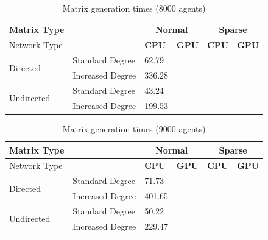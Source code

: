 \documentclass{article}
\begin{document}
\begin{table}[H]
    \centering
    \begin{tabular}{llllll}
        \toprule
        Matrix Type &  & \multicolumn{2}{c}{Normal} & \multicolumn{2}{c}{Sparse}\\
        \midrule 
        Network Type &  &\textbf{CPU} & \textbf{GPU} & \textbf{CPU} & \textbf{GPU} \\
        \midrule
        \multirow{2}{*}{Directed} & Standard Degree & 62.79 & & & \\
                                  & Increased Degree & 336.28 & & & \\
        \multirow{2}{*}{Undirected} & Standard Degree & 43.24 & & & \\
                                  & Increased Degree & 199.53 & & & \\
        \bottomrule
    \end{tabular}
    \label{table:gen_8000}
    \caption{Matrix generation times (8000 agents)}
\end{table}

\begin{table}[H]
    \centering
    \begin{tabular}{llllll}
        \toprule
        Matrix Type &  & \multicolumn{2}{c}{Normal} & \multicolumn{2}{c}{Sparse}\\
        \midrule 
        Network Type &  &\textbf{CPU} & \textbf{GPU} & \textbf{CPU} & \textbf{GPU} \\
        \midrule
        \multirow{2}{*}{Directed} & Standard Degree & 71.73 & & & \\
                                  & Increased Degree & 401.65 & & & \\
        \multirow{2}{*}{Undirected} & Standard Degree & 50.22 & & & \\
                                  & Increased Degree & 229.47 & & & \\
        \bottomrule
    \end{tabular}
    \label{table:gen_9000}
    \caption{Matrix generation times (9000 agents)}
\end{table}
\end{document}
